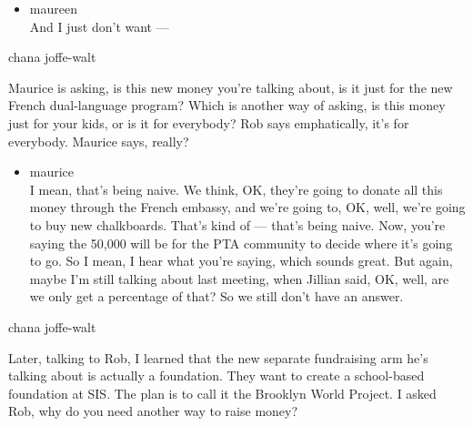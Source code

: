 \begin{itemize}
\tightlist
\item
  maureen\\
  And I just don't want ---
\end{itemize}

chana joffe-walt

Maurice is asking, is this new money you're talking about, is it just
for the new French dual-language program? Which is another way of
asking, is this money just for your kids, or is it for everybody? Rob
says emphatically, it's for everybody. Maurice says, really?

\begin{itemize}
\tightlist
\item
  maurice\\
  I mean, that's being naive. We think, OK, they're going to donate all
  this money through the French embassy, and we're going to, OK, well,
  we're going to buy new chalkboards. That's kind of --- that's being
  naive. Now, you're saying the 50,000 will be for the PTA community to
  decide where it's going to go. So I mean, I hear what you're saying,
  which sounds great. But again, maybe I'm still talking about last
  meeting, when Jillian said, OK, well, are we only get a percentage of
  that? So we still don't have an answer.
\end{itemize}

chana joffe-walt

Later, talking to Rob, I learned that the new separate fundraising arm
he's talking about is actually a foundation. They want to create a
school-based foundation at SIS. The plan is to call it the Brooklyn
World Project. I asked Rob, why do you need another way to raise money?

